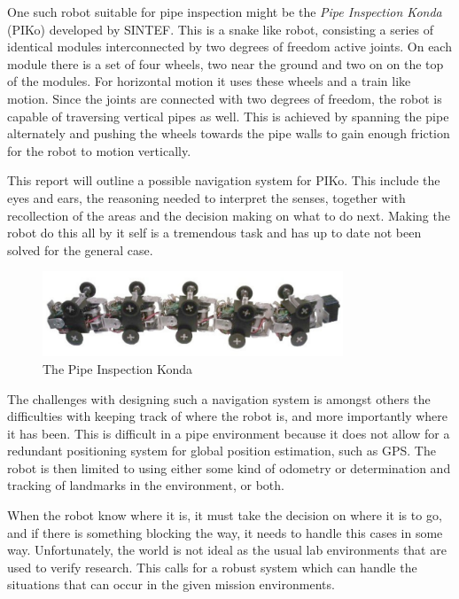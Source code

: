 One such robot suitable for pipe inspection might be the \emph{Pipe Inspection Konda}
(PIKo) developed by SINTEF. This is a snake like robot, consisting a series of identical
modules interconnected by two degrees of freedom active joints. On each module there is a
set of four wheels, two near the ground and two on on the top of the modules. For
horizontal motion it uses these wheels and a train like motion. Since the joints are
connected with two degrees of freedom, the robot is capable of traversing vertical pipes
as well. This is achieved by spanning the pipe alternately and pushing the wheels towards
the pipe walls to gain enough friction for the robot to motion vertically. \cite{piko}

This report will outline a possible navigation system for PIKo. This include the eyes and
ears, the reasoning needed to interpret the senses, together with recollection of the
areas and the decision making on what to do next. Making the robot do this all by it self
is a tremendous task and has up to date not been solved for the general case.
\begin{figure}[htbp]
    \centering
    \includegraphics[width=0.8\textwidth]{pics/piko}
    \caption{The Pipe Inspection Konda}
    \label{chap1:fig-piko}
\end{figure}

The challenges with designing such a navigation system is amongst others the difficulties
with keeping track of where the robot is, and more importantly where it has been. This is
difficult in a pipe environment because it does not allow for a redundant positioning
system for global position estimation, such as GPS. The robot is then limited to using
either some kind of odometry or determination and tracking of landmarks in the environment, 
or both. 

When the robot know where it is, it must take the decision on where it is to go, and if
there is something blocking the way, it needs to handle this cases in some way.
Unfortunately, the world is not ideal as the usual lab environments that are used to
verify research. This calls for a robust system which can handle the situations that can
occur in the given mission environments. 


